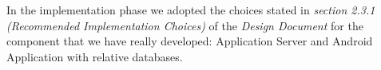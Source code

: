 In the implementation phase we adopted the choices stated in \textit{section 2.3.1 (Recommended Implementation Choices)} of the \textit{Design Document} for the component that we have really developed: Application Server and Android Application with relative databases.